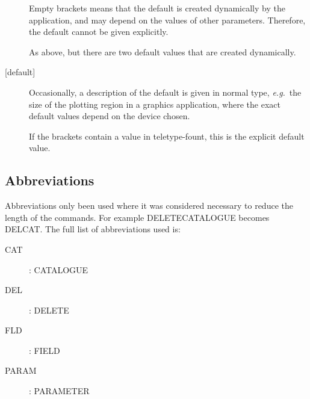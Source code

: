 \begin{description}

\item[{\mantt []}]
Empty brackets means that the default is created dynamically
by the application, and may depend on the values of other parameters.
Therefore, the default cannot be given explicitly.

\item[{\mantt [,]}]
As above, but there are two default values that are created dynamically.

\item[{\mantt [}{\rm default}{\mantt ]}]
Occasionally, a description of the default is given in normal type,
{\it e.g.}\ the size of the plotting region in a graphics application,
where the exact default values depend on the device chosen. 

\item[{\mantt [default]}]
If the brackets contain a value in teletype-fount, this is the explicit
default value.

\end{description}

\subsection{Abbreviations}

Abbreviations  only been used where it was considered necessary to reduce
the length of the commands. For example  {\small DELETECATALOGUE} becomes
{\small DELCAT}. The full list of abbreviations used is:

\begin{description}
\begin{description}
\item [CAT]: CATALOGUE
\item [DEL]: DELETE
\item [FLD]: FIELD
\item [PARAM]: PARAMETER
\end{description}
\end{description}






